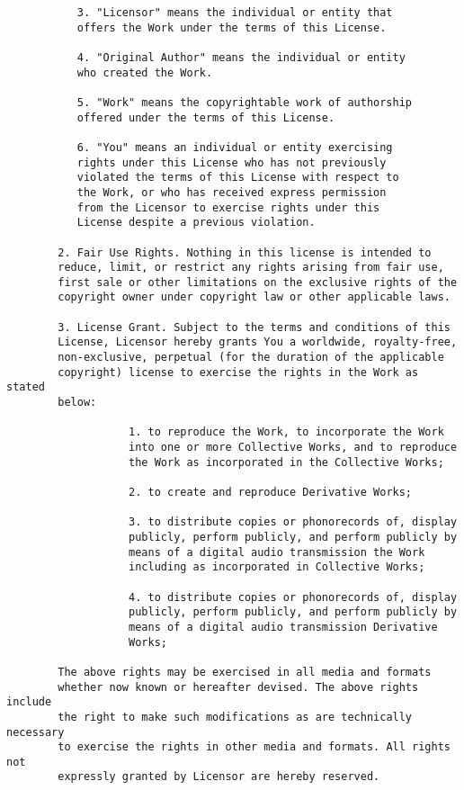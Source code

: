 \begin{verbatim}
           3. "Licensor" means the individual or entity that
           offers the Work under the terms of this License.
        
           4. "Original Author" means the individual or entity
           who created the Work.
        
           5. "Work" means the copyrightable work of authorship
           offered under the terms of this License.
        
           6. "You" means an individual or entity exercising
           rights under this License who has not previously
           violated the terms of this License with respect to
           the Work, or who has received express permission
           from the Licensor to exercise rights under this
           License despite a previous violation.

        2. Fair Use Rights. Nothing in this license is intended to
        reduce, limit, or restrict any rights arising from fair use,
        first sale or other limitations on the exclusive rights of the
        copyright owner under copyright law or other applicable laws.
        
        3. License Grant. Subject to the terms and conditions of this
        License, Licensor hereby grants You a worldwide, royalty-free,
        non-exclusive, perpetual (for the duration of the applicable
        copyright) license to exercise the rights in the Work as stated
        below:

                   1. to reproduce the Work, to incorporate the Work
                   into one or more Collective Works, and to reproduce
                   the Work as incorporated in the Collective Works;
                
                   2. to create and reproduce Derivative Works;
                
                   3. to distribute copies or phonorecords of, display
                   publicly, perform publicly, and perform publicly by
                   means of a digital audio transmission the Work
                   including as incorporated in Collective Works;
                
                   4. to distribute copies or phonorecords of, display
                   publicly, perform publicly, and perform publicly by
                   means of a digital audio transmission Derivative
                   Works;

        The above rights may be exercised in all media and formats
        whether now known or hereafter devised. The above rights include
        the right to make such modifications as are technically necessary
        to exercise the rights in other media and formats. All rights not
        expressly granted by Licensor are hereby reserved.
        

\end{verbatim}
